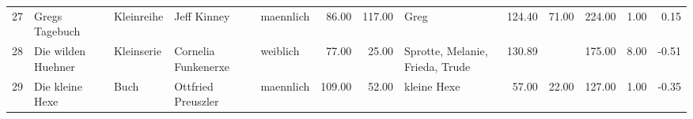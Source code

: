 \begin{sidewaystable}[ht]
\begin{center}
{\begin{tabular}{rllllrrlrrrrr}
  27 & Gregs Tagebuch                                                                                                                                                                                                                                                  & Kleinreihe & Jeff Kinney                                                                                                                                                                                                                                                     & maennlich & 86.00 & 117.00 & Greg                                                                                                                                                                                                                                                            & 124.40 & 71.00 & 224.00 & 1.00 & 0.15 \\ 
  28 & Die wilden Huehner                                                                                                                                                                                                                                              & Kleinserie & Cornelia Funkenerxe                                                                                                                                                                                                                                             & weiblich & 77.00 & 25.00 & Sprotte, Melanie, Frieda, Trude                                                                                                                                                                                                                                 & 130.89 &  & 175.00 & 8.00 & -0.51 \\ 
  29 & Die kleine Hexe                                                                                                                                                                                                                                                 & Buch & Ottfried Preuszler                                                                                                                                                                                                                                              & maennlich & 109.00 & 52.00 & kleine Hexe                                                                                                                                                                                                                                                     & 57.00 & 22.00 & 127.00 & 1.00 & -0.35 \\ 

\end{tabular}}
\end{center}
\end{sidewaystable}
